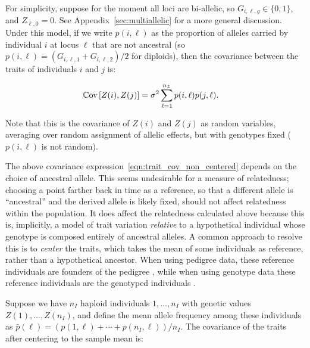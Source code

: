 For simplicity, suppose for the moment all loci are bi-allelic,
so $G_{i,\ell,g} \in \{0,1\}$, and $Z_{\ell,0} = 0$.
%
See Appendix~\ref{sec:multiallelic} for a more general discussion.
%
Under this model, if we write $p(i,\ell)$ as the proportion of alleles
carried by individual $i$ at locus $\ell$ that are not ancestral
(so $p(i,\ell) = (G_{i,\ell,1} + G_{i,\ell,2})/2$ for diploids),
then the  %
covariance between the traits of individuals $i$ and $j$ is:
%

\begin{align} \label{eqn:trait_cov_non_centered}
    \mathbb{C}\text{ov}\left[Z(i), Z(j)\right] &= \sigma^2 \sum_{\ell=1}^{n_L} p(i,\ell) p(j,\ell) .
\end{align}

%
Note that this is the covariance of $Z(i)$ and $Z(j)$ as random variables,
averaging over random assignment of allelic effects,
but with genotypes fixed ($p(i,\ell)$ is not random).


The above covariance expression~\eqref{eqn:trait_cov_non_centered}
depends on the choice of ancestral allele.
%
This seems undesirable for a measure of relatedness;
choosing a point farther back in time as a reference,
so that a different allele is ``ancestral'' and the derived allele is likely fixed,
should not affect relatedness within the population.
%
It does affect the relatedness calculated above because this is, implicitly,
a model of trait variation \emph{relative} to a hypothetical individual
whose genotype is composed entirely of ancestral alleles.
%
A common approach to resolve this is to \emph{center} the traits,
which takes the mean of some individuals as reference,
rather than a hypothetical ancestor.
%
When using pedigree data, these reference individuals are
founders of the pedigree \citep{wright1922coefficients},
while when using genotype data these reference individuals are
the genotyped individuals \citep{vanraden2008efficient}.

Suppose we have $n_I$ haploid individuals $1, \dots, n_I$
with genetic values $Z(1), \ldots, Z(n_I)$, %
and define the mean allele frequency among these individuals as
$\bar{p}(\ell) = (p(1,\ell) + \cdots + p(n_I,\ell))/{n_I}$.
%
The covariance of the traits 
after centering to the sample mean is:
%

